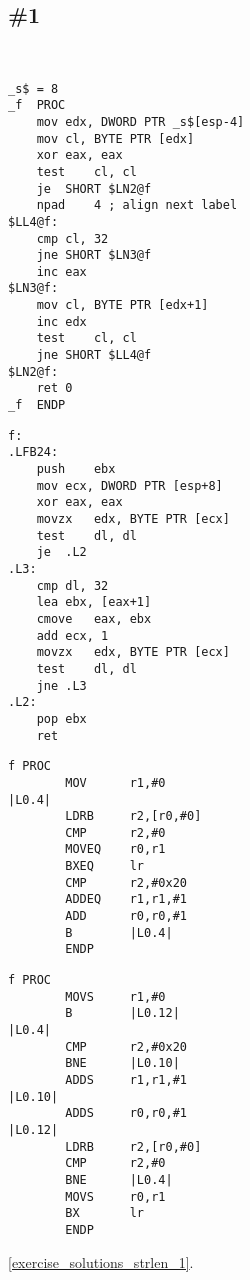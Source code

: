 \section{\Exercises}

\subsection{\Exercise \#1}
\label{exercise_strlen_1}

\WhatThisCodeDoes\

\begin{lstlisting}[caption=MSVC 2010 /Ox]
_s$ = 8			
_f	PROC
	mov	edx, DWORD PTR _s$[esp-4]
	mov	cl, BYTE PTR [edx]
	xor	eax, eax
	test	cl, cl
	je	SHORT $LN2@f
	npad	4 ; align next label
$LL4@f:
	cmp	cl, 32	
	jne	SHORT $LN3@f
	inc	eax
$LN3@f:
	mov	cl, BYTE PTR [edx+1]
	inc	edx
	test	cl, cl
	jne	SHORT $LL4@f
$LN2@f:
	ret	0
_f	ENDP
\end{lstlisting}

\begin{lstlisting}[caption=GCC 4.8.1 -O3]
f:
.LFB24:
	push	ebx
	mov	ecx, DWORD PTR [esp+8]
	xor	eax, eax
	movzx	edx, BYTE PTR [ecx]
	test	dl, dl
	je	.L2
.L3:
	cmp	dl, 32
	lea	ebx, [eax+1]
	cmove	eax, ebx
	add	ecx, 1
	movzx	edx, BYTE PTR [ecx]
	test	dl, dl
	jne	.L3
.L2:
	pop	ebx
	ret
\end{lstlisting}

\begin{lstlisting}[caption=Keil 5.03 (\ARMMode) -O3]
f PROC
        MOV      r1,#0
|L0.4|
        LDRB     r2,[r0,#0]
        CMP      r2,#0
        MOVEQ    r0,r1
        BXEQ     lr
        CMP      r2,#0x20
        ADDEQ    r1,r1,#1
        ADD      r0,r0,#1
        B        |L0.4|
        ENDP
\end{lstlisting}

\begin{lstlisting}[caption=Keil 5.03 (\ThumbMode) -O3]
f PROC
        MOVS     r1,#0
        B        |L0.12|
|L0.4|
        CMP      r2,#0x20
        BNE      |L0.10|
        ADDS     r1,r1,#1
|L0.10|
        ADDS     r0,r0,#1
|L0.12|
        LDRB     r2,[r0,#0]
        CMP      r2,#0
        BNE      |L0.4|
        MOVS     r0,r1
        BX       lr
        ENDP
\end{lstlisting}

\Answer\: \ref{exercise_solutions_strlen_1}.
